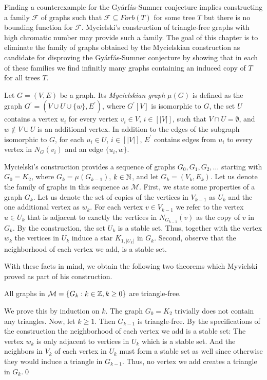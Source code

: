 Finding a counterexample for the Gyárfás-Sumner conjecture implies constructing a family $\mathcal{F}$ of graphs such that $\mathcal{F}\subseteq\textit{Forb}(T)$ for some tree $T$ but there is no bounding function for $\mathcal{F}$. Mycielski's construction of triangle-free graphs with high chromatic number \cite{My55} may provide such a family. The goal of this chapter is to eliminate the family of graphs obtained by the Mycielskian construction as candidate for disproving the Gyárfás-Sumner conjecture by showing that in each of these families we find infinitly many graphs containing an induced copy of $T$ for all trees $T$.

\begin{defn}
Let $G=(V,E)$ be a graph. Its \textit{Mycielskian graph} $\mu(G)$ is defined as the graph $G^\prime=(V\cup U\cup\{w\}, E^\prime)$, where $G^\prime [V]$ is isomorphic to $G$, the set $U$ contains a vertex $u_i$ for every vertex $v_i\in V$, $i\in [\vert V\vert]$, such that $V\cap U=\emptyset$, and $w\notin V\cup U$ is an additional vertex. In addition to the edges of the subgraph isomorphic to $G$, for each $u_i\in U$, $i\in [\vert V\vert]$, $E^\prime$ contains edges from $u_i$ to every vertex in $N_G(v_i)$ and an edge $\lbrace u_i ,w\rbrace$. 
\end{defn}
Mycielski's construction provides a sequence of graphs $G_0,G_1, G_2,\dots $ starting with $G_0=K_2$, where $G_k = \mu (G_{k-1})$, $k\in\mathbb{N}$, and let $G_k=(V_k,E_k)$. Let us denote the family of graphs in this sequence as $\mathcal{M}$. First, we state some properties of a graph $G_k$. Let us denote the set of copies of the vertices in $V_{k-1}$ as $U_k$ and the one additional vertex as $w_k$. For each vertex $v\in V_{k-1}$ we refer to the vertex $u\in U_k$ that is adjacent to exactly the vertices in $N_{G_{k-1}}(v)$ as the copy of $v$ in $G_k$. By the construction, the set $U_k$ is a stable set. Thus, together with the vertex $w_k$ the vertices in $U_k$ induce a star $K_{1, \vert U_k\vert}$ in $G_k$.
Second, observe that the neighborhood of each vertex we add, is a stable set.

With these facts in mind, we obtain the following two theorems which Myvielski proved as part of his construction.

\begin{thm}\label{t2my}
All graphs in $\mathcal{M}=\{G_k:k\in\mathbb{Z}, k\geq 0\}$ are triangle-free.
\end{thm}
\begin{prf}
We prove this by induction on $k$. The graph $G_0=K_2$ trivially does not contain any triangles. Now, let $k\geq 1$. Then $G_{k-1}$ is triangle-free. By the specifications of the construction the neighborhood of each vertex we add is a stable set: The vertex $w_k$ is only adjacent to vertices in $U_k$ which is a stable set. And the neighbors in $V_k$ of each vertex in $U_k$ must form a stable set as well since otherwise they would induce a triangle in $G_{k-1}$. Thus, no vertex we add creates a triangle in $G_k$.\qed 
\end{prf}

